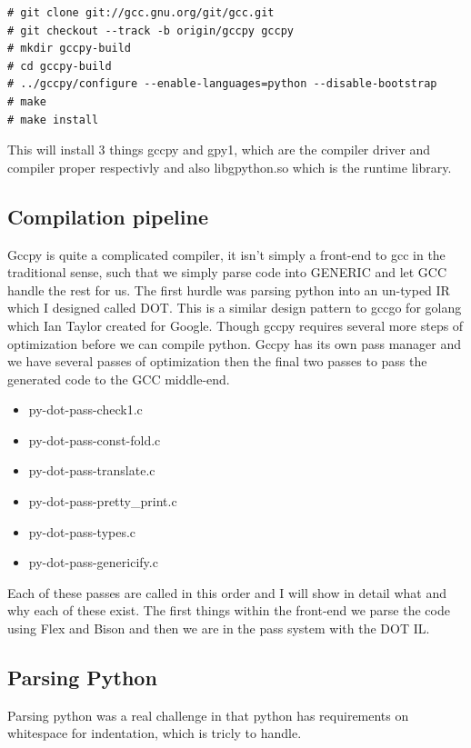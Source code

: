 \documentclass[defaultstyle,11pt]{article}
\begin{document}
\begin{lstlisting}
# git clone git://gcc.gnu.org/git/gcc.git
# git checkout --track -b origin/gccpy gccpy
# mkdir gccpy-build
# cd gccpy-build
# ../gccpy/configure --enable-languages=python --disable-bootstrap
# make
# make install
\end{lstlisting}

This will install 3 things gccpy and gpy1, which are the compiler driver and compiler proper respectivly and also libgpython.so
which is the runtime library.

\subsection{Compilation pipeline}
Gccpy is quite a complicated compiler, it isn't simply a front-end to gcc in the traditional sense, such that we simply parse code
into GENERIC and let GCC handle the rest for us. The first hurdle was parsing python into an un-typed IR which I designed called DOT.
This is a similar design pattern to gccgo for golang which Ian Taylor created for Google. Though gccpy requires several more steps of
optimization before we can compile python. Gccpy has its own pass manager and we have several passes of optimization then the final
two passes to pass the generated code to the GCC middle-end.

\begin{itemize}
  \item py-dot-pass-check1.c
  \item py-dot-pass-const-fold.c
  \item py-dot-pass-translate.c
  \item py-dot-pass-pretty\_print.c
  \item py-dot-pass-types.c
  \item py-dot-pass-genericify.c
\end{itemize}

Each of these passes are called in this order and I will show in detail what and why each of these exist. The first things
within the front-end we parse the code using Flex and Bison and then we are in the pass system with the DOT IL.

\subsection{Parsing Python}
Parsing python was a real challenge in that python has requirements on whitespace for indentation, which is tricly to handle.
\end{document}
